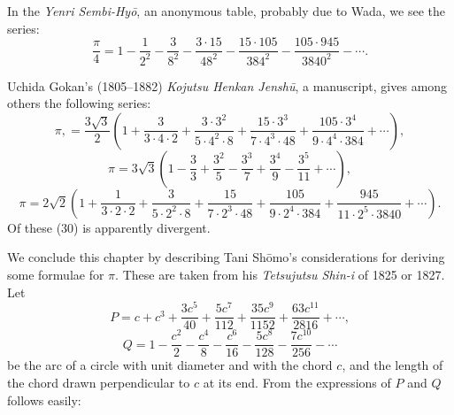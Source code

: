 \documentclass[11pt]{article}
\newcommand{\scanfooter}{}
\newcommand{\dd}{\mathbin{\cdot}}
\begin{document}
In the \emph{Yenri Sembi-Hyō}, an anonymous table, probably due to Wada, we see the series:
\[
\tag{28}\frac{\pi}{4}=1-\frac1{2^2}-\frac3{8^2}-\frac{3\dd15}{48^2}-\frac{15\dd105}{384^2}-\frac{105\dd945}{3840^2}-\cdots.
\]

Uchida Gokan's (1805--1882) \emph{Kojutsu Henkan Jenshū}, a manuscript, gives among others the following series:
\[
\tag{29}\pi\mathpunct{,}=\frac{3\sqrt3}{2}\left(1+\frac3{3\dd4\dd2}+\frac{3\dd3^2}{5\dd4^2\dd8}+\frac{15\dd3^3}{7\dd4^3\dd48}+\frac{105\dd3^4}{9\dd4^4\dd384}+\cdots\right),
\]
\[
\tag{30}\pi=3\sqrt3\left(1-\frac33+\frac{3^2}{5}-\frac{3^3}{7}+\frac{3^4}{9}-\frac{3^5}{11}+\cdots\right),
\]
\[
\tag{31}\pi=2\sqrt2\left(1+\frac1{3\dd2\dd2}+\frac3{5\dd2^2\dd8}+\frac{15}{7\dd2^3\dd48}+\frac{105}{9\dd2^4\dd384}+\frac{945}{11\dd2^5\dd3840}+\cdots\right).
\]
Of these (30) is apparently divergent.

We conclude this chapter by describing Tani Shōmo's considerations for deriving some formulae for $\pi$. These are taken from his \emph{Tetsujutsu Shin-i} of 1825 or 1827. Let
\[
P=c+c^3+\frac{3c^5}{40}+\frac{5c^7}{112}+\frac{35c^9}{1152}+\frac{63c^{11}}{2816}+\cdots,
\]
\[
Q=1-\frac{c^2}{2}-\frac{c^4}{8}-\frac{c^6}{16}-\frac{5c^8}{128}-\frac{7c^{10}}{256}-\cdots
\]
be the arc of a circle with unit diameter and with the chord $c$, and the length of the chord drawn perpendicular to $c$ at its end. From the expressions of $P$ and $Q$ follows easily:
\scanfooter
\end{document}
